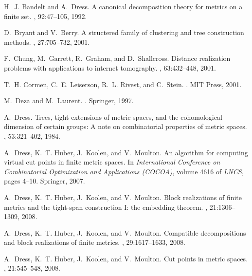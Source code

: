 \documentclass[12pt]{article}
\begin{document}
\begin{thebibliography}{10}

H.~J. Bandelt and A.~Dress.
\newblock A canonical decomposition theory for metrics on a finite set.
, 92:47--105, 1992.

D.~Bryant and V.~Berry.
\newblock A structered family of clustering and tree construction methods.
, 27:705--732, 2001.

F.~Chung, M.~Garrett, R.~Graham, and D.~Shallcross.
\newblock Distance realization problems with applications to internet
  tomography.
, 63:432--448, 2001.

T.~H. Cormen, C.~E. Leiserson, R.~L. Rivest, and C.~Stein.
.
\newblock MIT Press, 2001.

M.~Deza and M.~Laurent.
.
\newblock Springer, 1997.

A.~Dress.
\newblock Trees, tight extensions of metric spaces, and the cohomological
  dimension of certain groups: A note on combinatorial properties of metric
  spaces.
, 53:321--402, 1984.

A.~Dress, K.~T. Huber, J.~Koolen, and V.~Moulton.
\newblock An algorithm for computing virtual cut points in finite metric
  spaces.
\newblock In {\em International Conference on Combinatorial Optimization and
  Applications (COCOA)}, volume 4616 of {\em LNCS}, pages 4--10. Springer,
  2007.

A.~Dress, K.~T. Huber, J.~Koolen, and V.~Moulton.
\newblock Block realizations of finite metrics and the tight-span construction
  {I}: the embedding theorem.
, 21:1306--1309, 2008.

A.~Dress, K.~T. Huber, J.~Koolen, and V.~Moulton.
\newblock Compatible decompositions and block realizations of finite metrics.
, 29:1617--1633, 2008.

A.~Dress, K.~T. Huber, J.~Koolen, and V.~Moulton.
\newblock Cut points in metric spaces.
, 21:545--548, 2008.


\end{thebibliography}
\end{document}
